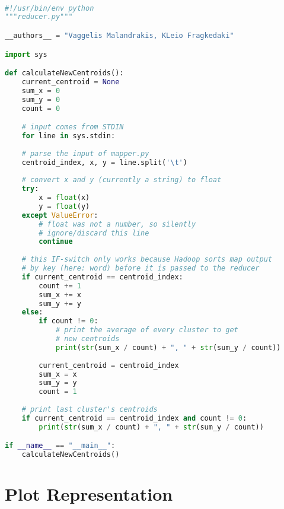   \HRule \\[0.2cm] %
  
\begin{lstlisting}[language=Python]
#!/usr/bin/env python
"""reducer.py"""

__authors__ = "Vaggelis Malandrakis, KLeio Fragkedaki"

import sys

def calculateNewCentroids():
	current_centroid = None
	sum_x = 0
	sum_y = 0
	count = 0

	# input comes from STDIN
	for line in sys.stdin:
	
	# parse the input of mapper.py
	centroid_index, x, y = line.split('\t')
	
	# convert x and y (currently a string) to float
	try:
		x = float(x)
		y = float(y)
	except ValueError:
		# float was not a number, so silently
		# ignore/discard this line
		continue
	
	# this IF-switch only works because Hadoop sorts map output
	# by key (here: word) before it is passed to the reducer
	if current_centroid == centroid_index:
		count += 1
		sum_x += x
		sum_y += y
	else:
		if count != 0:
			# print the average of every cluster to get  
			# new centroids
			print(str(sum_x / count) + ", " + str(sum_y / count))
		
		current_centroid = centroid_index
		sum_x = x
		sum_y = y
		count = 1
	
	# print last cluster's centroids
	if current_centroid == centroid_index and count != 0:
		print(str(sum_x / count) + ", " + str(sum_y / count))

if __name__ == "__main__":
	calculateNewCentroids()
\end{lstlisting}

\section{Plot Representation}




